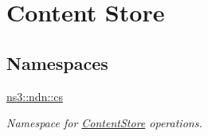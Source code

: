 \hypertarget{group__ndn-cs}{}\section{Content Store}
\label{group__ndn-cs}
\subsection*{Namespaces}
\begin{DoxyCompactItemize}
\item 
 \hyperlink{namespacens3_1_1ndn_1_1cs}{ns3\+::ndn\+::cs}
\begin{DoxyCompactList}\small\item\em Namespace for \hyperlink{classns3_1_1ndn_1_1ContentStore}{Content\+Store} operations. \end{DoxyCompactList}\end{DoxyCompactItemize}
